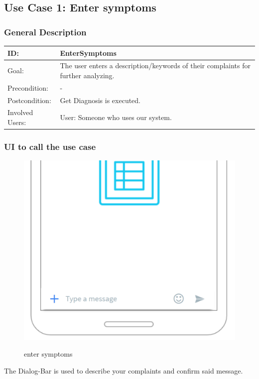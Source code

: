 \subsection{Use Case 1: Enter symptoms}
\subsubsection{General Description}

\begin{tabular}{|p{.2\linewidth}|p{.65\linewidth}|}
\hline 
ID: & EnterSymptoms \\ \hline
Goal: & The user enters a description/keywords of their complaints for further analyzing. \\ \hline
Precondition: & - \\ \hline
Postcondition: & Get Diagnosis is executed. \\ \hline
Involved Users: &User: Someone who uses our system. \\ \hline
\end{tabular}

\subsubsection{UI to call the use case}
\begin{minipage}{0.4\textwidth}
\begin{figure}[H]
\centering
\includegraphics[scale=.4]{SystemSpec/Usecases/Mocks/entersym01.png}\\
\caption{\label{fig:blue_rectangle}enter symptoms}
\end{figure}
\end{minipage} \hfill
\begin{minipage}{0.6\textwidth}
The Dialog-Bar is used to describe your complaints and confirm said message.
\end{minipage}


